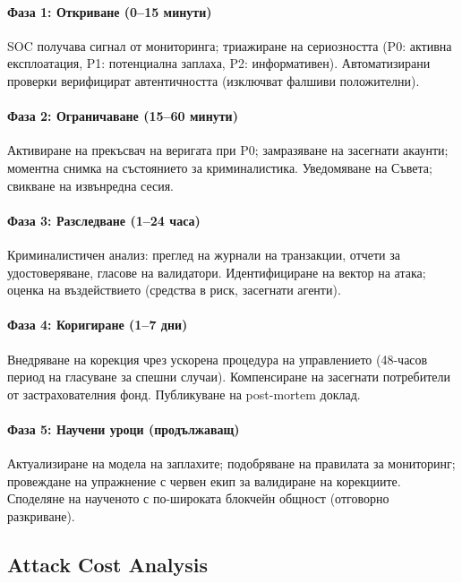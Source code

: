 \documentclass[11pt]{article}
\begin{document}
\paragraph{Фаза 1: Откриване (0--15 минути)}
SOC получава сигнал от мониторинга; триажиране на сериозността (P0: активна експлоатация, P1: потенциална заплаха, P2: информативен). Автоматизирани проверки верифицират автентичността (изключват фалшиви положителни).

\paragraph{Фаза 2: Ограничаване (15--60 минути)}
Активиране на прекъсвач на веригата при P0; замразяване на засегнати акаунти; моментна снимка на състоянието за криминалистика. Уведомяване на Съвета; свикване на извънредна сесия.

\paragraph{Фаза 3: Разследване (1--24 часа)}
Криминалистичен анализ: преглед на журнали на транзакции, отчети за удостоверяване, гласове на валидатори. Идентифициране на вектор на атака; оценка на въздействието (средства в риск, засегнати агенти).

\paragraph{Фаза 4: Коригиране (1--7 дни)}
Внедряване на корекция чрез ускорена процедура на управлението (48-часов период на гласуване за спешни случаи). Компенсиране на засегнати потребители от застрахователния фонд. Публикуване на post-mortem доклад.

\paragraph{Фаза 5: Научени уроци (продължаващ)}
Актуализиране на модела на заплахите; подобряване на правилата за мониторинг; провеждане на упражнение с червен екип за валидиране на корекциите. Споделяне на наученото с по-широката блокчейн общност (отговорно разкриване).

\subsection{Attack Cost Analysis}
\end{document}
